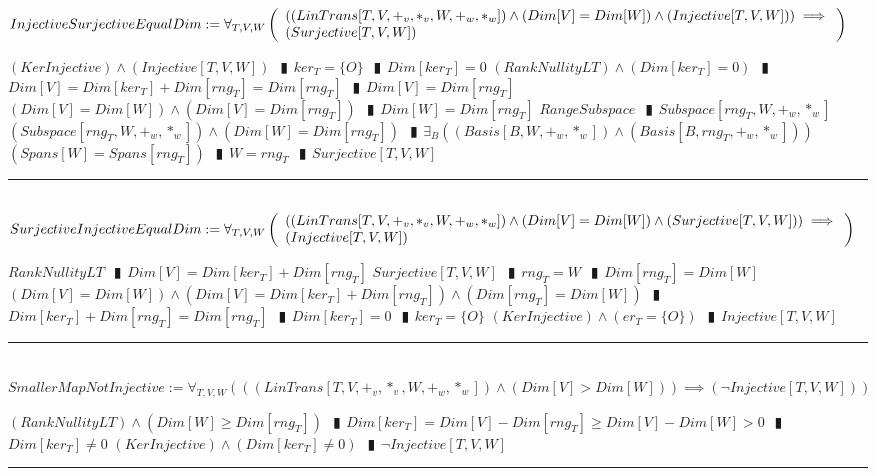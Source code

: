 \documentclass{book}
\newcommand{\abr}{:=}
\newcommand{\pipe}{$\phantom{(}\vrectangleblack\phantom{)}$}
\newcommand{\pr}[1]{\left(#1\right)}
\begin{document}
$InjectiveSurjectiveEqualDim \abr \forall_{T, V, W}\left(\begin{array}{ll}
  \pr{(LinTrans[T, V, +_v, *_v, W, +_w, *_w]) \land (Dim[V] = Dim[W]) \land (Injective[T, V, W])} \hfill \implies \hfill \\
  (Surjective[T, V, W])
\end{array}\right)$
\begin{enumerate}
  \lit $(KerInjective) \land (Injective[T, V, W])$ \pipe $ker_T = \{O\}$ \pipe $Dim[ker_T] = 0$
  \lit $(RankNullityLT) \land (Dim[ker_T] = 0)$ \pipe $Dim[V] = Dim[ker_T] + Dim[rng_T] = Dim[rng_T]$ \pipe $Dim[V] = Dim[rng_T]$
  \lit $(Dim[V] = Dim[W]) \land (Dim[V] = Dim[rng_T])$ \pipe $Dim[W] = Dim[rng_T]$
  \lit $RangeSubspace$ \pipe $Subspace[rng_T, W, +_w, *_w]$
  \lit $(Subspace[rng_T, W, +_w, *_w]) \land (Dim[W] = Dim[rng_T])$ \pipe $\exists_{B}\pr{(Basis[B, W, +_w, *_w]) \land (Basis[B, rng_T, +_w, *_w])}$
  \lit $(Spans[W] = Spans[rng_T])$ \pipe $W = rng_T$ \pipe $Surjective[T, V, W]$
\end{enumerate} \vspace{.75mm} \hrule \vspace{.75mm} \ \\ 

$SurjectiveInjectiveEqualDim \abr \forall_{T, V, W}\left(\begin{array}{ll}
  \pr{(LinTrans[T, V, +_v, *_v, W, +_w, *_w]) \land (Dim[V] = Dim[W]) \land (Surjective[T, V, W])} \hfill \implies \hfill \\
  (Injective[T, V, W])
\end{array}\right)$
\begin{enumerate}
  \lit $RankNullityLT$ \pipe $Dim[V] = Dim[ker_T] + Dim[rng_T]$
  \lit $Surjective[T, V, W]$ \pipe $rng_T = W$ \pipe $Dim[rng_T] = Dim[W]$
  \lit $(Dim[V] = Dim[W]) \land (Dim[V] = Dim[ker_T] + Dim[rng_T]) \land (Dim[rng_T] = Dim[W])$ \pipe $Dim[ker_T] + Dim[rng_T] = Dim[rng_T]$ \pipe $Dim[ker_T] = 0$ \pipe $ker_T = \{O\}$
  \lit $(KerInjective) \land (er_T = \{O\})$ \pipe $Injective[T, V, W]$
\end{enumerate} \vspace{.75mm} \hrule \vspace{.75mm} \ \\ 

$SmallerMapNotInjective \abr \forall_{T, V, W}\pr{\pr{(LinTrans[T, V, +_v, *_v, W, +_w, *_w]) \land (Dim[V] > Dim[W])} \implies (\lnot Injective[T, V, W])}$
\begin{enumerate}
  \lit $(RankNullityLT) \land (Dim[W] \geq Dim[rng_T])$ \pipe $Dim[ker_T] = Dim[V] - Dim[rng_T] \geq Dim[V] - Dim[W] > 0$ \pipe $Dim[ker_T] \neq 0$
  \lit $(KerInjective) \land (Dim[ker_T] \neq 0)$ \pipe $\lnot Injective[T, V, W]$
\end{enumerate} \vspace{.75mm} \hrule \vspace{.75mm} \ \\ 
\end{document}
